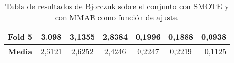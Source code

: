 \begin{table}[H]
{\begin{tabular}{|crrrrrr|}
\multicolumn{1}{|c|}{\textbf{Fold 5}} & \multicolumn{1}{c|}{3,098}             & \multicolumn{1}{c|}{3,1355}              & \multicolumn{1}{c|}{2,8384}          & \multicolumn{1}{c|}{0,1996}            & \multicolumn{1}{c|}{0,1888}              & 0,0938                             \\ \hline
\multicolumn{1}{|c|}{\textbf{Media}}  & \multicolumn{1}{c|}{2,6121}           & \multicolumn{1}{c|}{2,6252}             & \multicolumn{1}{c|}{2,4246}         & \multicolumn{1}{c|}{0,2247}           & \multicolumn{1}{c|}{0,2219}             & 0,1125                             \\ \hline
\end{tabular}%
}
\caption{Tabla de resultados de Bjorczuk sobre el conjunto con SMOTE y con MMAE como función de ajuste.}\label{tablaBJORCZUKconSMOTEconMMAE}
\end{table}



